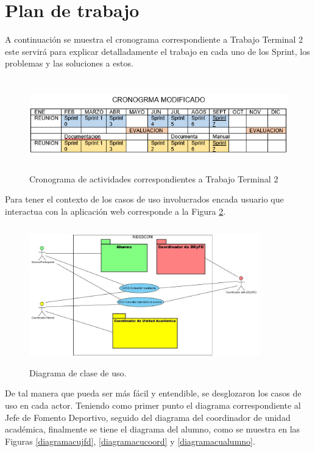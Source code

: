 	\section{Plan de trabajo}
	\noindent A continuación se muestra el cronograma correspondiente a Trabajo Terminal 2 este servirá para explicar detalladamente el trabajo en cada uno de los Sprint, los problemas y las soluciones a estos.
	\begin{figure}[hbt!]
		\centering
		\includegraphics[width=13cm, height=4cm]{Imagenes/cronograma}
		\caption{Cronograma de actividades correspondientes a Trabajo Terminal 2}
		\label{cronograma}
	\end{figure}
\pagebreak

	\noindent Para tener el contexto de los casos de uso involucrados encada usuario que interactua con la aplicación web corresponde a la Figura \ref{diagramaCU}.
	\begin{figure}[hbt!]
		\centering
		\includegraphics[width=10cm, height=6cm]{Imagenes/diagramaCU}
		\caption{Diagrama de clase de uso.}
		\label{diagramaCU}
	\end{figure}

	\noindent De tal manera que pueda ser más fácil y entendible, se desglozaron los casos de uso en cada actor. Teniendo como primer punto el diagrama correspondiente al Jefe de Fomento Deportivo, seguido del diagrama del coordinador de unidad académica, finalmente se tiene el diagrama del alumno, como se muestra en las Figuras \ref{diagramacujfd}, \ref{diagramacucoord} y \ref{diagramacualumno}.
	
